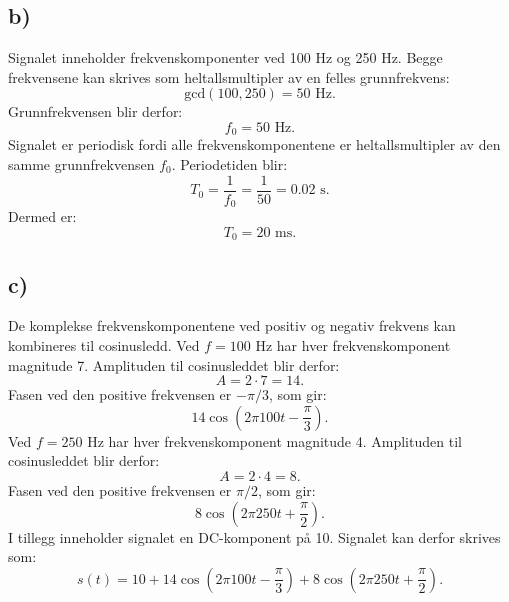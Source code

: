 \subsection*{b)}
Signalet inneholder frekvenskomponenter ved 100 Hz og 250 Hz.
Begge frekvensene kan skrives som heltallsmultipler av en felles grunnfrekvens:
\[
    \mathrm{gcd}(100, 250) = 50 \text{ Hz}.
\]
Grunnfrekvensen blir derfor:
\[
f_0=50\text{ Hz}.
\]
Signalet er periodisk fordi alle frekvenskomponentene er heltallsmultipler av den samme grunnfrekvensen $f_0$.
Periodetiden blir:
\[
T_0=\frac{1}{f_0}
=\frac{1}{50}
=0.02\text{ s}.
\]
Dermed er:
\[
\boxed{T_0=20\text{ ms}}.
\]
\subsection*{c)}
De komplekse frekvenskomponentene ved positiv og negativ frekvens kan kombineres til cosinusledd.
Ved $f=100$ Hz har hver frekvenskomponent magnitude 7.
Amplituden til cosinusleddet blir derfor:
\[
A=2\cdot7=14.
\]
Fasen ved den positive frekvensen er $-\pi/3$, som gir:
\[
14\cos\left(2\pi100t-\frac{\pi}{3}\right).
\]
Ved $f=250$ Hz har hver frekvenskomponent magnitude 4.
Amplituden til cosinusleddet blir derfor:
\[
A=2\cdot4=8.
\]
Fasen ved den positive frekvensen er $\pi/2$, som gir:
\[
8\cos\left(2\pi250t+\frac{\pi}{2}\right).
\]
I tillegg inneholder signalet en DC-komponent på 10.
Signalet kan derfor skrives som:
\[
\boxed{
s(t)=10
+14\cos\left(2\pi100t-\frac{\pi}{3}\right)
+8\cos\left(2\pi250t+\frac{\pi}{2}\right)
}.
\]